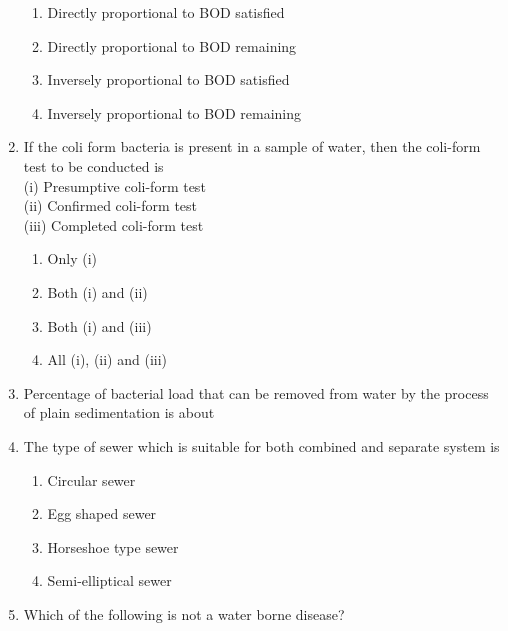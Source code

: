 \documentclass[11pt,a4paper]{article}
\begin{document}
\begin{enumerate}
\begin{enumerate}[label=\Alph*.]
\item{Directly proportional to BOD satisfied}
\item{Directly proportional to BOD remaining}
\item{Inversely proportional to BOD satisfied}
\item{Inversely proportional to BOD remaining}
\end{enumerate}
\item{If the coli form bacteria is present in a sample of water, then the coli-form test to be conducted is \\
 (i) Presumptive coli-form test \\
 (ii) Confirmed coli-form test \\
 (iii) Completed coli-form test}
\begin{enumerate}[label=\Alph*.]
\item{Only (i)}
\item{Both (i) and (ii)}
\item{Both (i) and (iii)}
\item{All (i), (ii) and (iii)}
\end{enumerate}
\item{Percentage of bacterial load that can be removed from water by the process of plain sedimentation is about}
\\
\item{The type of sewer which is suitable for both combined and separate system is}
\begin{enumerate}[label=\Alph*.]
\item{Circular sewer}
\item{Egg shaped sewer}
\item{Horseshoe type sewer}
\item{Semi-elliptical sewer}
\end{enumerate}
\item{Which of the following is not a water borne disease?}
\\
\end{enumerate}
\end{document}
